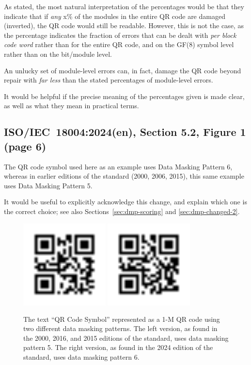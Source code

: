 \documentclass[a4paper,twoside]{article}
\newcommand{\shortstandard}{ISO/IEC~18004}
\newcommand{\standard}{\shortstandard:2024(en)}
\begin{document}
As stated, the most natural interpretation of the percentages would be that they indicate that if \emph{any} x\% of the
modules in the entire QR code are damaged (inverted), the QR code would still be readable. However, this is not the
case, as the percentage indicates the fraction of errors that can be dealt with \emph{per block code word} rather than for
the entire QR code, and on the GF(8) symbol level rather than on the bit/module level.

An unlucky set of module-level errors can, in fact, damage the QR code beyond repair with \emph{far less} than the stated
percentages of module-level errors.

It would be helpful if the precise meaning of the percentages given is made clear, as well as what they mean in practical
terms.

\subsection{\standard, Section 5.2, Figure 1 (page 6)}
\label{sec:dmp-changed-1}

The QR code symbol used here as an example uses Data Masking Pattern 6, whereas in earlier editions of the standard
(2000, 2006, 2015), this same example uses Data Masking Pattern 5.

It would be useful to explicitly acknowledge this change, and explain which one is the correct choice;
see also Sections~\ref{sec:dmp-scoring} and \ref{sec:dmp-changed-2}.

\begin{figure}[h]
\centering
\includegraphics[width=0.4\textwidth]{images/qrcode_iso18004_2000_2006_2015_QRCodeSymbol_1Mp5.png}
\includegraphics[width=0.4\textwidth]{images/qrcode_iso18004_2024_QRCodeSymbol_1Mp6.png}
\caption{The text ``QR Code Symbol'' represented as a 1-M QR code using two different data masking patterns.
         The left version, as found in the 2000, 2016, and 2015 editions of the standard, uses data masking pattern 5.
         The right version, as found in the 2024 edition of the standard, uses data masking pattern 6.}
\end{figure}
\end{document}
